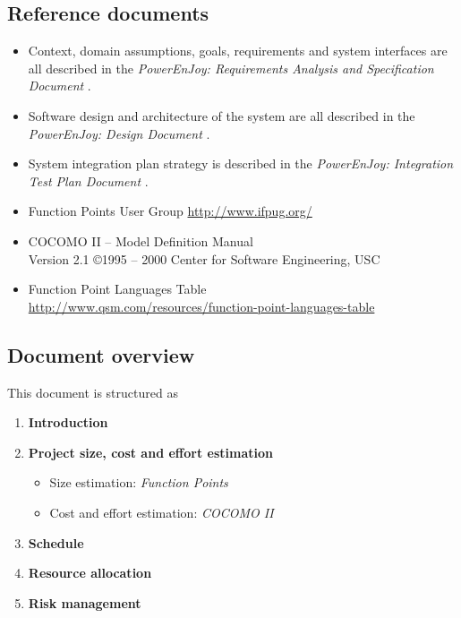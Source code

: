 \subsection{Reference documents}
\begin{itemize}
\item Context, domain assumptions, goals, requirements and system interfaces are all described in the \emph{PowerEnJoy: Requirements Analysis and Specification Document} \cite{RASD}.
\item Software design and architecture of the system are all described in the \emph{PowerEnJoy: Design Document} \cite{DD}.
\item System integration plan strategy is described in the \emph{PowerEnJoy: Integration Test Plan Document} \cite{ITPD}.
\item Function Points User Group \url{http://www.ifpug.org/}
\item COCOMO II – Model Definition Manual \\
Version 2.1 \copyright 1995 – 2000 Center for Software Engineering, USC
\item Function Point Languages Table \\ 
\url{http://www.qsm.com/resources/function-point-languages-table}
\end{itemize}


\subsection{Document overview}
This document is structured as
\begin{enumerate}
	\item \textbf{Introduction}
	\item \textbf{Project size, cost and effort estimation}
	\begin{itemize}
		\item Size estimation: \emph{Function Points}
		\item Cost and effort estimation: \emph{COCOMO II}
	\end{itemize}
	\item \textbf{Schedule}
	\item \textbf{Resource allocation}
	\item \textbf{Risk management}
\end{enumerate}